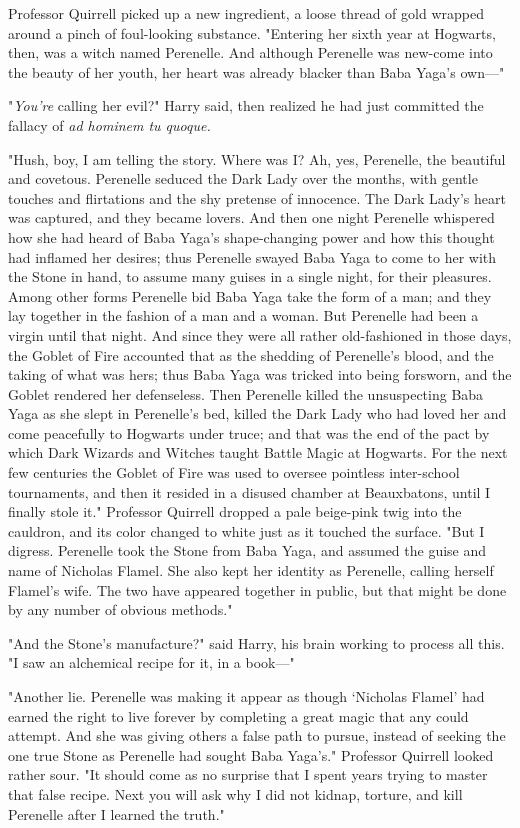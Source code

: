 Professor Quirrell picked up a new ingredient, a loose thread of gold wrapped
around a pinch of foul-looking substance. "Entering her sixth year at Hogwarts,
then, was a witch named Perenelle. And although Perenelle was new-come into the
beauty of her youth, her heart was already blacker than Baba Yaga's own\mbox{---}"

"\emph{You're} calling her evil?" Harry said, then realized he had just
committed the fallacy of \emph{ad hominem tu quoque.}

"Hush, boy, I am telling the story. Where was I? Ah, yes, Perenelle, the
beautiful and covetous. Perenelle seduced the Dark Lady over the months, with
gentle touches and flirtations and the shy pretense of innocence. The Dark
Lady's heart was captured, and they became lovers. And then one night Perenelle
whispered how she had heard of Baba Yaga's shape-changing power and how this
thought had inflamed her desires; thus Perenelle swayed Baba Yaga to come to
her with the Stone in hand, to assume many guises in a single night, for their
pleasures. Among other forms Perenelle bid Baba Yaga take the form of a man;
and they lay together in the fashion of a man and a woman. But Perenelle had
been a virgin until that night. And since they were all rather old-fashioned in
those days, the Goblet of Fire accounted that as the shedding of Perenelle's
blood, and the taking of what was hers; thus Baba Yaga was tricked into being
forsworn, and the Goblet rendered her defenseless. Then Perenelle killed the
unsuspecting Baba Yaga as she slept in Perenelle's bed, killed the Dark Lady
who had loved her and come peacefully to Hogwarts under truce; and that was the
end of the pact by which Dark Wizards and Witches taught Battle Magic at
Hogwarts. For the next few centuries the Goblet of Fire was used to oversee
pointless inter-school tournaments, and then it resided in a disused chamber at
Beauxbatons, until I finally stole it." Professor Quirrell dropped a pale
beige-pink twig into the cauldron, and its color changed to white just as it
touched the surface. "But I digress. Perenelle took the Stone from Baba Yaga,
and assumed the guise and name of Nicholas Flamel. She also kept her identity
as Perenelle, calling herself Flamel's wife. The two have appeared together in
public, but that might be done by any number of obvious methods."

"And the Stone's manufacture?" said Harry, his brain working to process all
this. "I saw an alchemical recipe for it, in a book\mbox{---}"

"Another lie. Perenelle was making it appear as though `Nicholas Flamel' had
earned the right to live forever by completing a great magic that any could
attempt. And she was giving others a false path to pursue, instead of seeking
the one true Stone as Perenelle had sought Baba Yaga's." Professor Quirrell
looked rather sour. "It should come as no surprise that I spent years trying to
master that false recipe. Next you will ask why I did not kidnap, torture, and
kill Perenelle after I learned the truth."

